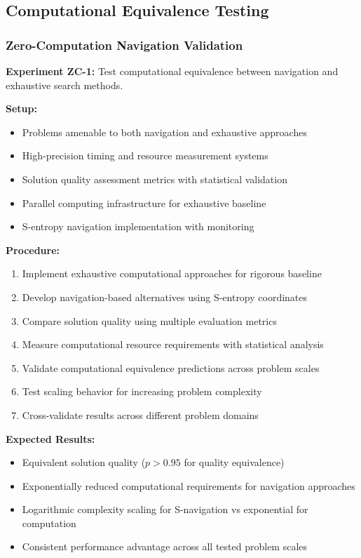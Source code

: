 \documentclass[11pt]{article}
\theoremstyle{definition}
\theoremstyle{remark}
\begin{document}
\subsection{Computational Equivalence Testing}

\subsubsection{Zero-Computation Navigation Validation}

\textbf{Experiment ZC-1:} Test computational equivalence between navigation and exhaustive search methods.

\textbf{Setup:}
\begin{itemize}
\item Problems amenable to both navigation and exhaustive approaches
\item High-precision timing and resource measurement systems
\item Solution quality assessment metrics with statistical validation
\item Parallel computing infrastructure for exhaustive baseline
\item S-entropy navigation implementation with monitoring
\end{itemize}

\textbf{Procedure:}
\begin{enumerate}
\item Implement exhaustive computational approaches for rigorous baseline
\item Develop navigation-based alternatives using S-entropy coordinates
\item Compare solution quality using multiple evaluation metrics
\item Measure computational resource requirements with statistical analysis
\item Validate computational equivalence predictions across problem scales
\item Test scaling behavior for increasing problem complexity
\item Cross-validate results across different problem domains
\end{enumerate}

\textbf{Expected Results:} 
\begin{itemize}
\item Equivalent solution quality ($p > 0.95$ for quality equivalence)
\item Exponentially reduced computational requirements for navigation approaches
\item Logarithmic complexity scaling for S-navigation vs exponential for computation
\item Consistent performance advantage across all tested problem scales
\end{itemize}
\end{document}
